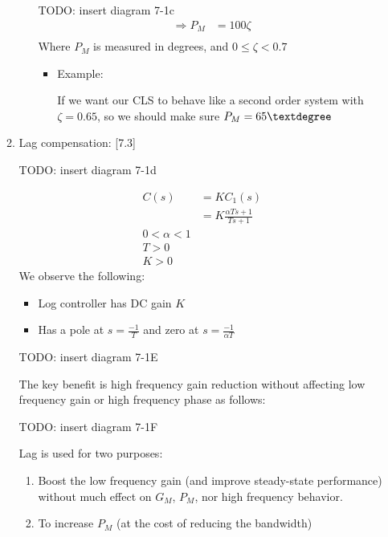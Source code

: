 \begin{enumerate}
\begin{enumerate}
\begin{enumerate}
                        TODO: insert diagram 7-1c
                        \begin{align*}
                            \Rightarrow P_M &= 100 \zeta \\
                        \end{align*}
                        Where $P_M$ is measured in degrees, and $0 \le \zeta < 0.7$
                        \begin{itemize}
                            \item Example:

                                If we want our CLS to behave like a second order system with $\zeta = 0.65$, so we should make sure $P_M = 65\textdegree$
                        \end{itemize}
                \end{enumerate}

            \item Lag compensation: [7.3]

                TODO: insert diagram 7-1d

                \begin{align*}
                    C(s) &= K C_1(s)  \\
                    &= K \frac{\alpha Ts + 1}{Ts + 1} \\
                    0 < \alpha < 1 \\
                    T > 0 \\
                    K > 0
                \end{align*}
                We observe the following:
                \begin{itemize}
                    \item Log controller has DC gain $K$
                    \item Has a pole at $s = \frac{-1}{T}$ and zero at $s = \frac{-1}{\alpha T}$
                \end{itemize}

                TODO: insert diagram 7-1E

                The key benefit is high frequency gain reduction without affecting low frequency gain or high frequency phase as follows:

                TODO: insert diagram 7-1F

                Lag is used for two purposes:
                \begin{enumerate}
                    \item Boost the low frequency gain (and improve steady-state performance) without much effect on $G_M$, $P_M$, nor high frequency behavior.
                    \item To increase $P_M$ (at the cost of reducing the bandwidth)


\end{enumerate}
\end{enumerate}
\end{enumerate}
